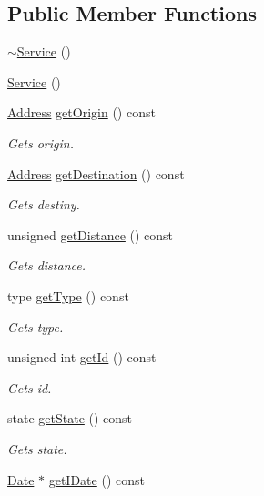 \subsection*{Public Member Functions}
\begin{DoxyCompactItemize}
\item 
\hyperlink{class_service_af6c3577b59652ac817d1d76aaccee904}{$\sim$\+Service} ()
\item 
\hyperlink{class_service_acc246c9f7ed3c51e2d91d10fe257513f}{Service} ()
\item 
\hyperlink{class_address}{Address} \hyperlink{class_service_a186e0115cc0197181b4e060bfe4cd502}{get\+Origin} () const
\begin{DoxyCompactList}\small\item\em Gets origin. \end{DoxyCompactList}\item 
\hyperlink{class_address}{Address} \hyperlink{class_service_a2aabf308bd77e1de07afa28d5ff72b08}{get\+Destination} () const
\begin{DoxyCompactList}\small\item\em Gets destiny. \end{DoxyCompactList}\item 
unsigned \hyperlink{class_service_a7b36594e1a24656f065f7d41b79bb718}{get\+Distance} () const
\begin{DoxyCompactList}\small\item\em Gets distance. \end{DoxyCompactList}\item 
type \hyperlink{class_service_a75f96cd94a42b604ff179343576e1bba}{get\+Type} () const
\begin{DoxyCompactList}\small\item\em Gets type. \end{DoxyCompactList}\item 
unsigned int \hyperlink{class_service_a5a19731d4fa91658afe908167fe66ad6}{get\+Id} () const
\begin{DoxyCompactList}\small\item\em Gets id. \end{DoxyCompactList}\item 
state \hyperlink{class_service_adf7f337e38c8de87e82b42f15c7ccad3}{get\+State} () const
\begin{DoxyCompactList}\small\item\em Gets state. \end{DoxyCompactList}\item 
\hyperlink{class_date}{Date} $\ast$ \hyperlink{class_service_a3a8b665eff7933227303dc070bb29485}{get\+I\+Date} () const

\end{DoxyCompactItemize}
